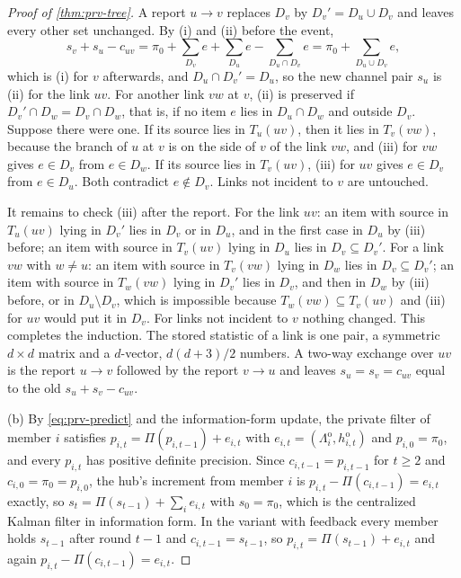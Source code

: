 \begin{proof}[Proof of \cref{thm:prv-tree}]
A report $u\to v$ replaces $D_v$ by $D_v'=D_u\cup D_v$ and leaves every other set unchanged. By (i) and (ii) before the event,
\[
s_v+s_u-c_{uv}=\pi_0+\sum_{D_v}e+\sum_{D_u}e-\sum_{D_u\cap D_v}e=\pi_0+\sum_{D_u\cup D_v}e,
\]
which is (i) for $v$ afterwards, and $D_u\cap D_v'=D_u$, so the new channel pair $s_u$ is (ii) for the link $uv$. For another link $vw$ at $v$, (ii) is preserved if $D_v'\cap D_w=D_v\cap D_w$, that is, if no item $e$ lies in $D_u\cap D_w$ and outside $D_v$. Suppose there were one. If its source lies in $T_u(uv)$, then it lies in $T_v(vw)$, because the branch of $u$ at $v$ is on the side of $v$ of the link $vw$, and (iii) for $vw$ gives $e\in D_v$ from $e\in D_w$. If its source lies in $T_v(uv)$, (iii) for $uv$ gives $e\in D_v$ from $e\in D_u$. Both contradict $e\notin D_v$. Links not incident to $v$ are untouched.

It remains to check (iii) after the report. For the link $uv$: an item with source in $T_u(uv)$ lying in $D_v'$ lies in $D_v$ or in $D_u$, and in the first case in $D_u$ by (iii) before; an item with source in $T_v(uv)$ lying in $D_u$ lies in $D_v\subseteq D_v'$. For a link $vw$ with $w\ne u$: an item with source in $T_v(vw)$ lying in $D_w$ lies in $D_v\subseteq D_v'$; an item with source in $T_w(vw)$ lying in $D_v'$ lies in $D_v$, and then in $D_w$ by (iii) before, or in $D_u\setminus D_v$, which is impossible because $T_w(vw)\subseteq T_v(uv)$ and (iii) for $uv$ would put it in $D_v$. For links not incident to $v$ nothing changed. This completes the induction. The stored statistic of a link is one pair, a symmetric $d\times d$ matrix and a $d$-vector, $d(d+3)/2$ numbers. A two-way exchange over $uv$ is the report $u\to v$ followed by the report $v\to u$ and leaves $s_u=s_v=c_{uv}$ equal to the old $s_u+s_v-c_{uv}$.

(b) By \eqref{eq:prv-predict} and the information-form update, the private filter of member $i$ satisfies $p_{i,t}=\Pi(p_{i,t-1})+e_{i,t}$ with $e_{i,t}=(\Lambda^{\mathrm o}_i,h^{\mathrm o}_{i,t})$ and $p_{i,0}=\pi_0$, and every $p_{i,t}$ has positive definite precision. Since $c_{i,t-1}=p_{i,t-1}$ for $t\ge2$ and $c_{i,0}=\pi_0=p_{i,0}$, the hub's increment from member $i$ is $p_{i,t}-\Pi(c_{i,t-1})=e_{i,t}$ exactly, so $s_t=\Pi(s_{t-1})+\sum_ie_{i,t}$ with $s_0=\pi_0$, which is the centralized Kalman filter in information form. In the variant with feedback every member holds $s_{t-1}$ after round $t-1$ and $c_{i,t-1}=s_{t-1}$, so $p_{i,t}=\Pi(s_{t-1})+e_{i,t}$ and again $p_{i,t}-\Pi(c_{i,t-1})=e_{i,t}$.
\end{proof}

